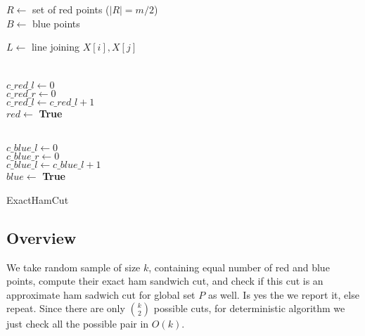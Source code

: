 \documentclass[a4paper]{article}
\begin{document}
\begin{algorithm}[H]
\SetAlgoLined
{}
$R \leftarrow$ set of red points ($|R| = m/2$) \\
$B \leftarrow$ blue points \\
 {
	 {
		$L \leftarrow$ line joining $X[i], X[j]$ \\
		\\
		\\
		$c\_red\_l \leftarrow 0$  \\
		$c\_red\_r \leftarrow 0$  \\
		 {
			 {
				$c\_red\_l \leftarrow c\_red\_l + 1$\\
			}
		}
		 {
			$red \leftarrow $ \textbf{True} \\
		}

		\\
		$c\_blue\_l \leftarrow 0$  \\
		$c\_blue\_r \leftarrow 0$  \\
		 {
			 {
				$c\_blue\_l \leftarrow c\_blue\_l + 1$\\
			}
		}
		 {
			$blue \leftarrow $ \textbf{True} \\
		}

		 {
		}
	}
}
\caption*{ExactHamCut}
\end{algorithm}
\subsection*{Overview}
We take random sample of size $k$, containing equal number of red and blue points,
compute their exact ham sandwich cut, and
check if this cut is an approximate ham sadwich cut for global set $P$ as well.
Is yes the we report it, else repeat. Since there are only $k\choose2$ possible cuts, for deterministic algorithm we just check all the possible pair in $O(k)$.
\end{document}
